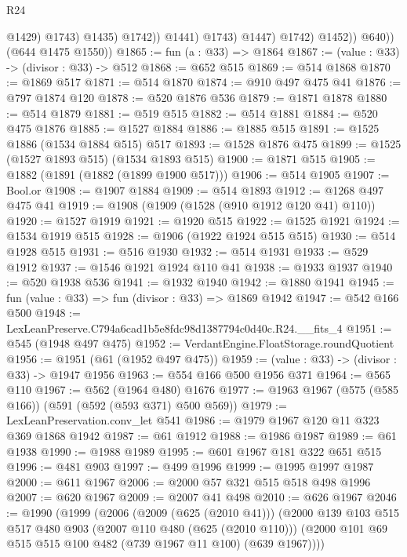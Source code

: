 \begin{lexlean}{R24}
\begin{coremodule}
                                @1429)
                              @1743)
                            @1435)
                          @1742))
                      @1441)
                    @1743)
                  @1447)
                @1742)
              @1452))
          @640))
      (@644 @1475 @1550))
@1865 := fun (a : @33) => @1864
@1867 := (value : @33) -> (divisor : @33) -> @512
@1868 := @652 @515
@1869 := @514 @1868
@1870 := @1869 @517
@1871 := @514 @1870
@1874 := @910 @497 @475 @41
@1876 := @797 @1874 @120
@1878 := @520 @1876 @536
@1879 := @1871 @1878
@1880 := @514 @1879
@1881 := @519 @515
@1882 := @514 @1881
@1884 := @520 @475 @1876
@1885 := @1527 @1884
@1886 := @1885 @515
@1891 := @1525 @1886 (@1534 @1884 @515) @517
@1893 := @1528 @1876 @475
@1899 := @1525 (@1527 @1893 @515) (@1534 @1893 @515)
@1900 := @1871 @515
@1905 := @1882 (@1891 (@1882 (@1899 @1900 @517)))
@1906 := @514 @1905
@1907 := Bool.or
@1908 := @1907 @1884
@1909 := @514 @1893
@1912 := @1268 @497 @475 @41
@1919 := @1908 (@1909 (@1528 (@910 @1912 @120 @41) @110))
@1920 := @1527 @1919
@1921 := @1920 @515
@1922 := @1525 @1921
@1924 := @1534 @1919 @515
@1928 := @1906 (@1922 @1924 @515 @515)
@1930 := @514 @1928 @515
@1931 := @516 @1930
@1932 := @514 @1931
@1933 := @529 @1912
@1937 := @1546 @1921 @1924 @110 @41
@1938 := @1933 @1937
@1940 := @520 @1938 @536
@1941 := @1932 @1940
@1942 := @1880 @1941
@1945 := fun (value : @33) => fun (divisor : @33) => @1869 @1942
@1947 := @542 @166 @500
@1948 := LexLeanPreserve.C794a6cad1b5e8fdc98d1387794c0d40c.R24.__fits_4
@1951 := @545 (@1948 @497 @475)
@1952 := VerdantEngine.FloatStorage.roundQuotient
@1956 := @1951 (@61 (@1952 @497 @475))
@1959 := (value : @33) -> (divisor : @33) -> @1947 @1956
@1963 := @554 @166 @500 @1956 @371
@1964 := @565 @110
@1967 := @562 (@1964 @480) @1676
@1977 := @1963 @1967 (@575 (@585 @166)) (@591 (@592 (@593 @371) @500 @569))
@1979 := LexLeanPreservation.conv_let @541
@1986 := @1979 @1967 @120 @11 @323 @369 @1868 @1942
@1987 := @61 @1912
@1988 := @1986 @1987
@1989 := @61 @1938
@1990 := @1988 @1989
@1995 := @601 @1967 @181 @322 @651 @515
@1996 := @481 @903
@1997 := @499 @1996
@1999 := @1995 @1997 @1987
@2000 := @611 @1967
@2006 := @2000 @57 @321 @515 @518 @498 @1996
@2007 := @620 @1967
@2009 := @2007 @41 @498
@2010 := @626 @1967
@2046 := @1990
    (@1999
      (@2006
        (@2009 (@625 (@2010 @41)))
        (@2000
          @139
          @103
          @515
          @517
          @480
          @903
          (@2007 @110 @480 (@625 (@2010 @110)))
          (@2000 @101 @69 @515 @515 @100 @482 (@739 @1967 @11 @100) (@639 @1967))))

\end{coremodule}
\end{lexlean}
